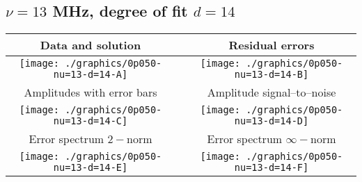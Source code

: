 

% 

\clearpage{}
\break{}

\subsection{$\nu = 13$ MHz, degree of fit $d = 14$}

\begin{table}[h]
    \begin{center}
        \begin{tabular}{ccc}
            Data and solution & \quad & Residual errors \\\hline
            \texttt{[image: ./graphics/0p050-nu=13-d=14-A]} &&
            \texttt{[image: ./graphics/0p050-nu=13-d=14-B]} \\[15pt]
            Amplitudes with error bars && Amplitude signal--to--noise \\\hline
            \texttt{[image: ./graphics/0p050-nu=13-d=14-C]} &&
            \texttt{[image: ./graphics/0p050-nu=13-d=14-D]} \\[15pt]
            Error spectrum $2-$norm && Error spectrum $\infty-$norm \\\hline
            \texttt{[image: ./graphics/0p050-nu=13-d=14-E]} &&
            \texttt{[image: ./graphics/0p050-nu=13-d=14-F]} \\[15pt]
        \end{tabular}
    \end{center}
\label{fig:elev=50, nu=13}
\end{table}



\endinput
